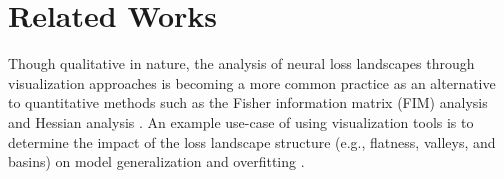 \documentclass[letterpaper]{article} %
\begin{document}
            


       \section{Related Works} \label{se:litreview}


            Though qualitative in nature, the analysis of neural loss landscapes through visualization approaches  \cite{NIPS2018_7875} is becoming a more common practice \cite{NIPS2018_8095, mei2018mean, nguyen2018loss} as an alternative to quantitative methods such as the Fisher information matrix (FIM) analysis \cite{karakida2019normalization} and Hessian analysis \cite{ma2022beyond, guiroy2019understanding}. An example use-case of using visualization tools is to determine the impact of the loss landscape structure (e.g., flatness, valleys, and basins) on model generalization and overfitting  \cite{pmlr-v137-huang20a, sypherd2020alphaloss, yang2021taxonomizing, prabhu2019understanding, xu2019understanding}.
\end{document}
